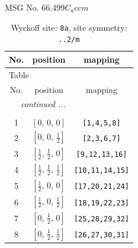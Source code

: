 \documentclass[fleqn,8pt]{jsarticle}
\begin{document}
\setcounter{MaxMatrixCols}{32}

\renewcommand{\tablename}{Table~}
\renewcommand{\figurename}{Figure~}
\begin{center}
\LARGE
MSG No. 66.499\quad$C_{a}ccm$
\end{center}
\renewcommand{\arraystretch}{1.2}
\begin{longtable}{ccc}
\caption{Wyckoff site: {\tt 8a}, site symmetry: {\tt ..2/m}}
 \\
 \hline \hline
No. & position & mapping \\ \hline \endfirsthead

\multicolumn{2}{l}{\tablename\ \thetable{}} \\
 \hline \hline
No. & position & mapping \\ \hline \endhead

 \hline \hline
\multicolumn{2}{r}{\footnotesize\it continued ...} \\ \endfoot

 \hline \hline
\multicolumn{2}{r}{} \\ \endlastfoot

1 & $\left[ 0,\, 0,\, 0 \right]$ & {\tt [1,4,5,8]} \\ \hline
2 & $\left[ 0,\, 0,\, \frac{1}{2} \right]$ & {\tt [2,3,6,7]} \\ \hline
3 & $\left[ \frac{1}{2},\, \frac{1}{2},\, 0 \right]$ & {\tt [9,12,13,16]} \\ \hline
4 & $\left[ \frac{1}{2},\, \frac{1}{2},\, \frac{1}{2} \right]$ & {\tt [10,11,14,15]} \\ \hline
5 & $\left[ \frac{1}{2},\, 0,\, 0 \right]$ & {\tt [17,20,21,24]} \\ \hline
6 & $\left[ \frac{1}{2},\, 0,\, \frac{1}{2} \right]$ & {\tt [18,19,22,23]} \\ \hline
7 & $\left[ 0,\, \frac{1}{2},\, 0 \right]$ & {\tt [25,28,29,32]} \\ \hline
8 & $\left[ 0,\, \frac{1}{2},\, \frac{1}{2} \right]$ & {\tt [26,27,30,31]} \\
\end{longtable}
\renewcommand{\arraystretch}{1.2}
\end{document}
